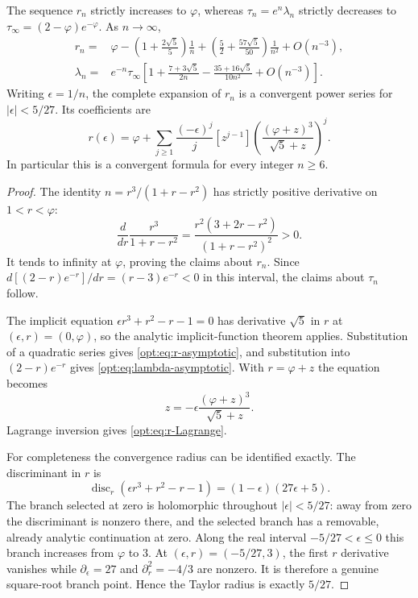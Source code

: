 \begin{theorem}
\label{opt:thm:asymptotic}
The sequence $r_n$ strictly increases to $\varphi$, whereas
$\tau_n=e^n\lambda_n$ strictly decreases to
$\tau_\infty=(2-\varphi)e^{-\varphi}$. As $n\to\infty$,
\begin{align}
 r_n={}&\varphi-
 \left(1+\frac{2\sqrt5}{5}\right)\frac1n
 +\left(\frac52+\frac{57\sqrt5}{50}\right)\frac1{n^2}
 +O(n^{-3}),\label{opt:eq:r-asymptotic}\\
 \lambda_n={}&e^{-n}\tau_\infty
 \left[1+\frac{7+3\sqrt5}{2n}
 -\frac{35+16\sqrt5}{10n^2}+O(n^{-3})\right].
 \label{opt:eq:lambda-asymptotic}
\end{align}
Writing $\epsilon=1/n$, the complete expansion of $r_n$ is a
convergent power series for $|\epsilon|<5/27$. Its coefficients are
\begin{equation}\label{opt:eq:r-Lagrange}
 r(\epsilon)=\varphi+
 \sum_{j\geq1}\frac{(-\epsilon)^j}{j}
 [z^{j-1}]
 \left(\frac{(\varphi+z)^3}{\sqrt5+z}\right)^j.
\end{equation}
In particular this is a convergent formula for every integer $n\geq6$.
\end{theorem}
\begin{proof}
The identity
$n=r^3/(1+r-r^2)$ has strictly positive derivative on $1<r<\varphi$:
\[
 \frac{d}{dr}\frac{r^3}{1+r-r^2}
 =\frac{r^2(3+2r-r^2)}{(1+r-r^2)^2}>0.
\]
It tends to infinity at $\varphi$, proving the claims about $r_n$.
Since $d[(2-r)e^{-r}]/dr=(r-3)e^{-r}<0$ in this interval,
the claims about $\tau_n$ follow.

The implicit equation
$\epsilon r^3+r^2-r-1=0$ has derivative $\sqrt5$ in $r$ at
$(\epsilon,r)=(0,\varphi)$, so the analytic implicit-function theorem
applies. Substitution of a quadratic series gives
\eqref{opt:eq:r-asymptotic}, and substitution into $(2-r)e^{-r}$ gives
\eqref{opt:eq:lambda-asymptotic}. With $r=\varphi+z$ the equation becomes
\[
 z=-\epsilon\frac{(\varphi+z)^3}{\sqrt5+z}.
\]
Lagrange inversion gives \eqref{opt:eq:r-Lagrange}.

For completeness the convergence radius can be identified exactly.
The discriminant in $r$ is
\[
 \operatorname{disc}_r(\epsilon r^3+r^2-r-1)
 =(1-\epsilon)(27\epsilon+5).
\]
The branch selected at zero is holomorphic throughout
$|\epsilon|<5/27$: away from zero the discriminant is nonzero there,
and the selected branch has a removable, already analytic continuation
at zero. Along the real interval $-5/27<\epsilon\leq0$ this branch
increases from $\varphi$ to $3$. At $(\epsilon,r)=(-5/27,3)$,
the first $r$ derivative vanishes while
$\partial_\epsilon=27$ and $\partial_r^2=-4/3$ are nonzero.
It is therefore a genuine square-root branch point. Hence the Taylor
radius is exactly $5/27$.
\end{proof}

